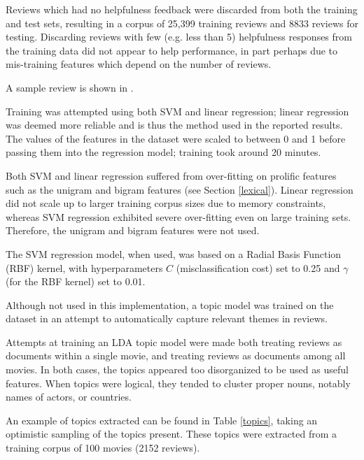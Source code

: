 \documentclass[letter,10pt]{article}
\begin{document}
Reviews which had no helpfulness feedback were discarded from both the
	training and test sets, resulting in a corpus of 25,399 training
	reviews and 8833 reviews for testing.
Discarding reviews with few (e.g. less than 5) helpfulness responses
	from the training data did not appear to help performance,
	in part perhaps due to mis-training features which depend on the
	number of reviews.

A sample review is shown in .



Training was attempted using both SVM and linear regression; linear regression
	was deemed more reliable and is thus the method used in the reported
	results.
The values of the features in the dataset were scaled to between 0 and 1
	before passing them into the regression model; training took around 20 minutes.

Both SVM and linear regression suffered from over-fitting on prolific features
	such as the unigram and bigram features (see Section \ref{lexical}).
Linear regression did not scale up to larger training corpus sizes due to
	memory constraints, whereas SVM regression exhibited severe over-fitting even
	on large training sets.
Therefore, the unigram and bigram features were not used.

The SVM regression model, when used, was based on a Radial Basis Function (RBF)
	kernel, with hyperparameters $C$ (misclassification cost) set to 0.25
	and $\gamma$ (for the RBF kernel) set to 0.01.

Although not used in this implementation, a topic model was trained
	on the dataset in an attempt to automatically capture relevant
	themes in reviews.

Attempts at training an LDA topic model were made both treating reviews
	as documents within a single movie, and treating reviews as documents
	among all movies.
In both cases, the topics appeared too disorganized to be used as useful
	features. 
When topics were logical, they tended to cluster proper nouns, notably
	names of actors, or countries.

An example of topics extracted can be found in Table \ref{topics}, taking
	an optimistic sampling of the topics present. 
These topics were extracted
	from a training corpus of 100 movies (2152 reviews).
\end{document}
